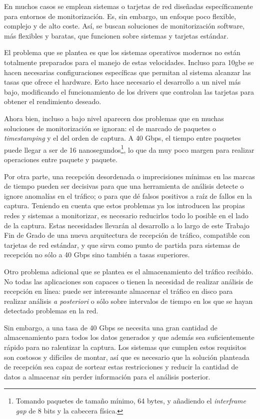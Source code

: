 \documentclass[twoside, 12pt]{epstfg}
\begin{document}
En muchos casos se emplean sistemas o tarjetas de red diseñadas específicamente para entornos de monitorización. Es, sin embargo, un enfoque poco flexible, complejo y de alto coste. Así,  se buscan soluciones de monitorización software, más flexibles y baratas, que funcionen sobre sistemas y tarjetas estándar.

El problema que se plantea es que los sistemas operativos modernos no están totalmente preparados para el manejo de estas velocidades. Incluso para \gls{10gbe} se hacen necesarias configuraciones específicas \cite{leitao2009tuning} que permitan al sistema alcanzar las tasas que ofrece el hardware. Esto hace necesario el desarrollo a un nivel más bajo, modificando el funcionamiento de los \glspl{driver} que controlan las tarjetas para obtener el rendimiento deseado.

Ahora bien, incluso a bajo nivel aparecen dos problemas que en muchas soluciones de monitorización se ignoran:  el de marcado de paquetes o \textit{timestamping} y el del orden de captura. A 40 Gbps, el tiempo entre paquetes puede llegar a ser de 16 nanosegundos\footnote{Tomando paquetes de tamaño mínimo, 64 bytes, y añadiendo el \textit{interframe gap} de 8 bits y la cabecera física.}, lo que da muy poco margen para realizar operaciones entre paquete y paquete.

Por otra parte, una recepción desordenada o imprecisiones mínimas en las marcas de tiempo pueden ser decisivas para que una herramienta de análisis detecte o ignore anomalías en el tráfico; o para que dé falsos positivos a raíz de fallos en la captura. Teniendo en cuenta que estos problemas ya los introducen las propias redes y sistemas a monitorizar, es necesario reducirlos todo lo posible en el lado de la captura. Estas necesidades llevarán al desarrollo a lo largo de este Trabajo Fin de Grado de una nueva arquitectura de recepción de tráfico, compatible con tarjetas de red estándar, y que sirva como punto de partida para sistemas de recepción no sólo a 40 Gbps sino también a tasas superiores.

Otro problema adicional que se plantea es el almacenamiento del tráfico recibido. No todas las aplicaciones son capaces o tienen la necesidad de realizar análisis de recepción en línea: puede ser interesante almacenar el tráfico en disco para realizar análisis \textit{a posteriori} o sólo sobre intervalos de tiempo en los que se hayan detectado problemas en la red.

Sin embargo, a una tasa de 40 Gbps se necesita una gran cantidad de almacenamiento para todos los datos generados y que además sea suficientemente rápido para no ralentizar la captura. Los sistemas que cumplen estos requisitos son costosos y difíciles de montar, así que es necesario que la solución planteada de recepción sea capaz de sortear estas restricciones y reducir la cantidad de datos a almacenar sin perder información para el análisis posterior.
\end{document}
